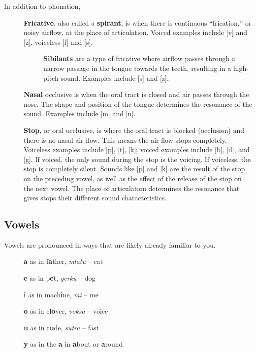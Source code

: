\documentclass[12pt]{book}
\begin{document}
In addition to phonation, 


\begin{description}
	\item[ ] \textbf{Fricative}, also called a \textbf{spirant}, is when there is continuous ``frication,'' or noisy airflow, at the place of articulation. Voiced examples include [v] and [z], voiceless [f] and [s].  
		\begin{description}
			\item[ ] \textbf{Sibilants} are a type of fricative where airflow passes through a narrow passage in the tongue towards the teeth, resulting in a high-pitch sound. Examples include [s] and [z]. 
		\end{description}
	\item[ ] \textbf{Nasal} occlusive is when the oral tract is closed and air passes through the nose. The shape and position of the tongue determines the resonance of the sound. Examples include [m] and [n].
	\item[ ] \textbf{Stop}, or oral occlusive, is where the oral tract is blocked (occlusion) and there is no nasal air flow. This means the air flow stops completely. Voiceless examples include [p], [t], [k]; voiced examples include [b], [d], and [g]. If voiced, the only sound during the stop is the voicing. If voiceless, the stop is completely silent. Sounds like [p] and [k] are the result of the stop on the preceding vowel, as well as the effect of the release of the stop on the next vowel. The place of articulation determines the resonance that gives stops their different sound characteristics. 
\end{description}






\subsection{Vowels}

Vowels are pronounced in ways that are likely already familiar to you.

\begin{description}
\item[ ] \textbf{a} as in f\textbf{a}ther, \emph{mlatu} -- cat
\item[ ] \textbf{e} as in p\textbf{e}t, \emph{gerku} -- dog
\item[ ] \textbf{i} as in mach\textbf{i}ne, \emph{mi} -- me
\item[ ] \textbf{o} as in cl\textbf{o}ver, \emph{voksa} -- voice
\item[ ] \textbf{u} as in r\textbf{u}de, \emph{sutra} -- fast
\item[ ] \textbf{y} as in the \textbf{a} in \textbf{a}bout or \textbf{a}round 
\end{description}
\end{document}
